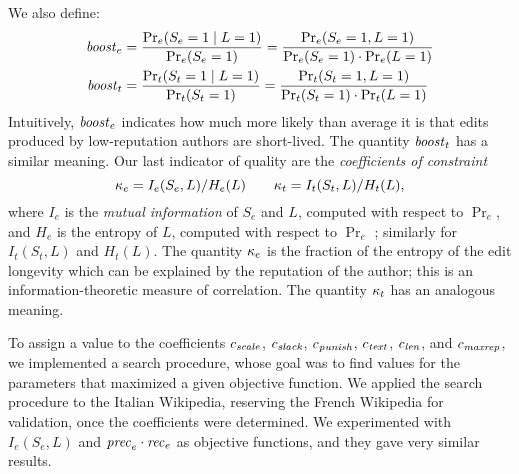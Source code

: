 We also define: 
%
\begin{align*}
  {\text{\textit{boost}}}_e & = \frac{\Pr_e(S_e=1 \mid L=1)}{\Pr_e(S_e=1)}
            = \frac{\Pr_e(S_e=1 , L=1)}{\Pr_e(S_e=1)\cdot\Pr_e(L=1)} \\
  {\text{\textit{boost}}}_t & = \frac{\Pr_t(S_t=1 \mid L=1)}{\Pr_t(S_t=1)}
            = \frac{\Pr_t(S_t=1 , L=1)}{\Pr_t(S_t=1)\cdot\Pr_t(L=1)}
\end{align*}
%
Intuitively, ${\text{\textit{boost}}}_e$ indicates how much more likely than average
it is that edits produced by low-reputation authors are short-lived.
The quantity ${\text{\textit{boost}}}_t$ has a similar meaning. 
Our last indicator of quality are the {\em coefficients of constraint\/}
\[ 
  \kappa_e = I_e(S_e,L) / H_e(L)
  \qquad 
  \kappa_t = I_t(S_t,L) / H_t(L),
\]
where $I_e$ is the {\em mutual information\/} of $S_e$ and $L$,
computed with respect to $\Pr_e$, and $H_e$ is the entropy of $L$,
computed with respect to $\Pr_e$ \cite{Cover1991}; similarly for
$I_t(S_t,L)$ and $H_t(L)$.
The quantity $\kappa_e$ is the fraction of the entropy of the
edit longevity which can be explained by the reputation of the author; 
this is an information-theoretic measure of correlation. 
The quantity $\kappa_t$ has an analogous meaning. 

To assign a value to the coefficients ${c_{{\text{\textit{scale}}}}}$, ${c_{{\text{\textit{slack}}}}}$,
${c_{{\text{\textit{punish}}}}}$, ${c_{{\text{\textit{text}}}}}$, ${c_{{\text{\textit{len}}}}}$, and ${c_{{\text{\textit{maxrep}}}}}$, 
we implemented a search procedure, whose goal was to find values for
the parameters that maximized a given objective function. 
We applied the search procedure to the Italian Wikipedia, reserving
the French Wikipedia for validation, once the coefficients were
determined. 
We experimented with $I_e(S_e,L)$ and ${\text{\textit{prec}}}_e \cdot {\text{\textit{rec}}}_e$
as objective functions, and they gave very similar results. 

